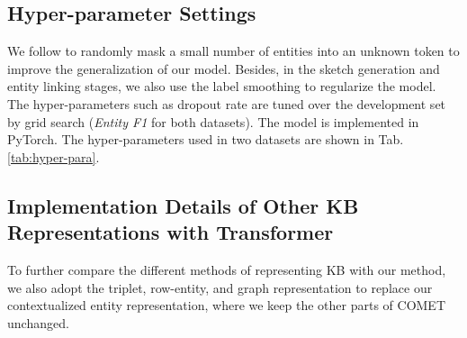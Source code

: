 \documentclass[11pt]{article}
\begin{document}
\subsection{Hyper-parameter Settings}


\begin{table}[htb]
\centering
{}
\caption{Hyper-parameters used in the two datasets.}
\label{tab:hyper-para}
\end{table}


We follow \cite{wu2018globaltolocal} to randomly mask a small number of entities into an unknown token to improve the generalization of our model. Besides, in the sketch generation and entity linking stages, we also use the label smoothing to regularize the model. The hyper-parameters such as dropout rate are tuned over the development set by grid search (\textit{Entity F1} for both datasets). The model is implemented in PyTorch. 
The hyper-parameters used in two datasets are shown in Tab. \ref{tab:hyper-para}.




\subsection{Implementation Details of Other KB Representations with Transformer}

To further compare the different methods of representing KB with our method, we also adopt the triplet, row-entity, and graph representation to replace our contextualized entity representation, where we keep the other parts of COMET unchanged. 
\end{document}
